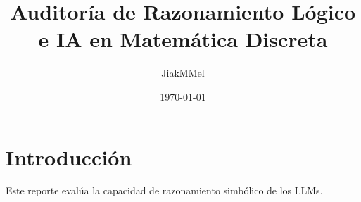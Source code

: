 \documentclass[12pt,letterpaper]{article}
\title{Auditoría de Razonamiento Lógico e IA en Matemática Discreta}
\author{JiakMMel}
\date{\today}
\begin{document}
\maketitle

\section{Introducción}
Este reporte evalúa la capacidad de razonamiento simbólico de los LLMs.
\end{document}

